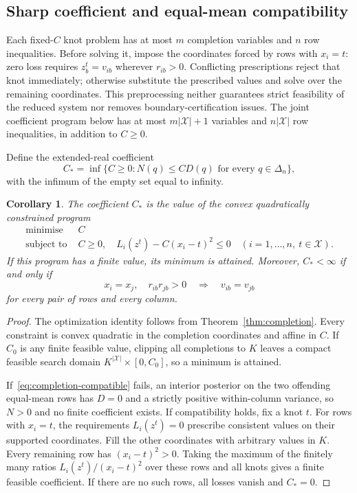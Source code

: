 \documentclass[11pt,a4paper]{article}
\newtheorem{corollary}[theorem]{Corollary}
\begin{document}
\subsection{Sharp coefficient and equal-mean compatibility}

Each fixed-$C$ knot problem has at most $m$ completion variables and $n$ row inequalities. Before solving it, impose the coordinates forced by rows with $x_i=t$: zero loss requires $z_b^t=v_{ib}$ wherever $r_{ib}>0$. Conflicting prescriptions reject that knot immediately; otherwise substitute the prescribed values and solve over the remaining coordinates. This preprocessing neither guarantees strict feasibility of the reduced system nor removes boundary-certification issues. The joint coefficient program below has at most $m|\mathcal X|+1$ variables and $n|\mathcal X|$ row inequalities, in addition to $C\geq0$.

Define the extended-real coefficient
\[
 C_* =\inf\{C\geq0:N(q)\leq CD(q)\text{ for every }q\in\Delta_n\},
\]
with the infimum of the empty set equal to infinity.

\begin{corollary}\label{cor:completion-coefficient}
The coefficient $C_*$ is the value of the convex quadratically constrained
program
\begin{equation}\label{eq:completion-QCQP}
 \begin{split}
 \text{minimise }&C\\
 \text{subject to }&C\geq0,\quad
 L_i(z^t)-C(x_i-t)^2\leq0
 \quad(i=1,\ldots,n,\ t\in\mathcal X).
 \end{split}
\end{equation}
If this program has a finite value, its minimum is attained. Moreover,
$C_*<\infty$ if and only if
\begin{equation}\label{eq:completion-compatible}
 x_i=x_j,\quad r_{ib}r_{jb}>0
 \quad\Longrightarrow\quad v_{ib}=v_{jb}
\end{equation}
for every pair of rows and every column.
\end{corollary}

\begin{proof}
The optimization identity follows from Theorem~\ref{thm:completion}.
Every constraint is convex quadratic in the completion coordinates and
affine in $C$. If $C_0$ is any finite feasible value, clipping all
completions to $K$ leaves a compact feasible search domain
$K^{|\mathcal X|}\times[0,C_0]$, so a minimum is attained.

If~\eqref{eq:completion-compatible} fails, an interior posterior on the
two offending equal-mean rows has $D=0$ and a strictly positive
within-column variance, so $N>0$ and no finite coefficient exists.
If compatibility holds, fix a knot $t$. For rows with $x_i=t$, the
requirements $L_i(z^t)=0$ prescribe consistent values on their supported
coordinates. Fill the other coordinates with arbitrary values in $K$.
Every remaining row has $(x_i-t)^2>0$. Taking the maximum of the finitely
many ratios $L_i(z^t)/(x_i-t)^2$ over these rows and all knots gives a
finite feasible coefficient. If there are no such rows, all losses
vanish and $C_*=0$.
\end{proof}
\end{document}
